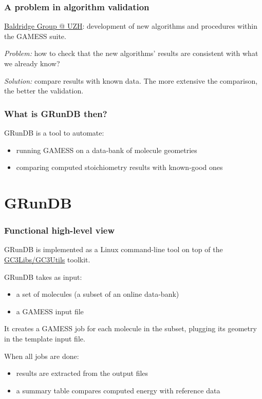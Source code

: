 \documentclass {beamer}
\newcommand{\largeskip}{\vspace{1em}}
\def\+{\largeskip}
\begin{document}
\begin{frame}
  \frametitle{A problem in algorithm validation}
  
  \href{http://www.oci.uzh.ch/group.pages/baldridge/index.php}{Baldridge
    Group @ UZH}: development of new algorithms and procedures within
  the GAMESS suite.
  
  \+
  \emph{Problem:} how to check that the new algorithms' results are
  consistent with what we already know?

  \+
  \emph{Solution:} compare results with known data.  The more extensive the
  comparison, the better the validation.
\end{frame}

\begin{frame}
  \frametitle{What is GRunDB then?}
  
  GRunDB is a tool to automate:
  \begin{itemize}
  \item running GAMESS on a data-bank of molecule geometries
  \item comparing computed stoichiometry results with known-good ones
  \end{itemize}
\end{frame}

\section{GRunDB}

\begin{frame}
  \frametitle{Functional high-level view}

  GRunDB is implemented as a Linux command-line tool on top of the
  \href{http://gc3pie.googlecode.com/}{GC3Libs/GC3Utils} toolkit.

  \+
  GRunDB takes as input:
  \begin{itemize}
  \item a set of molecules (a subset of an online data-bank)
  \item a GAMESS input file
  \end{itemize}
  It creates a GAMESS job for each molecule in the subset, plugging
  its geometry in the template input file.

  \+
  When all jobs are done:
  \begin{itemize}
  \item results are extracted from the output files
  \item a summary table compares computed energy with reference data
  \end{itemize}

\end{frame}
\end{document}
